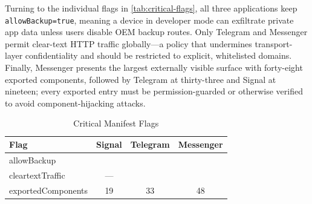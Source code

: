 \documentclass[a4paper,12pt]{report}
\newcommand{\cmark}{\ding{51}} %
\newcommand{\xmark}{\ding{55}} %
\begin{document}
\newcommand{\cmark}{\checkmark}        %
\newcommand{\xmark}{\ding{55}}

Turning to the individual flags in \autoref{tab:critical-flags}, all three applications keep \lstinline{allowBackup=true}, meaning a device in developer mode can exfiltrate private app data unless users disable OEM backup routes. Only Telegram and Messenger permit clear-text HTTP traffic globally—a policy that undermines transport-layer confidentiality and should be restricted to explicit, whitelisted domains. Finally, Messenger presents the largest externally visible surface with forty-eight exported components, followed by Telegram at thirty-three and Signal at nineteen; every exported entry must be permission-guarded or otherwise verified to avoid component-hijacking attacks.
\begin{table}[htbp]
  \centering
  \caption{Critical Manifest Flags}
  \label{tab:critical-flags}
  \begin{tabular}{|l|c|c|c|}
    \hline
    \textbf{Flag} & \textbf{Signal} & \textbf{Telegram} & \textbf{Messenger} \\ \hline
    allowBackup        & \cmark & \cmark & \cmark \\ \hline
    cleartextTraffic   & —      & \cmark & \cmark \\ \hline
    exportedComponents & 19     & 33     & 48     \\ \hline
  \end{tabular}
\end{table}
\end{document}
